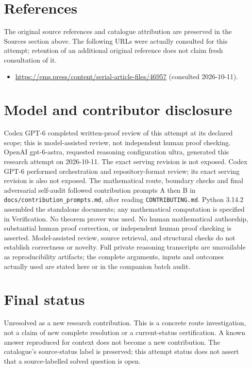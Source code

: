 \documentclass[11pt]{article}
\begin{document}
\section{References}
The original source references and catalogue attribution are preserved in the
Sources section above. The following URLs were actually consulted for this attempt;
retention of an additional original reference does not claim fresh consultation of it.
\begin{itemize}
\item \url{https://ems.press/content/serial-article-files/46957} (consulted 2026-10-11). 
\end{itemize}
\section{Model and contributor disclosure}
Codex GPT-6 completed written-proof review of this attempt at its declared scope; this is model-assisted review, not independent human proof checking.
OpenAI gpt-6-astra, requested reasoning configuration ultra, generated this research
attempt on 2026-10-11. The exact serving revision is not exposed. Codex GPT-6
performed orchestration and repository-format review; its exact serving revision
is also not exposed. The mathematical route, boundary checks and final adversarial
self-audit followed contribution prompts A then B in
\texttt{docs/contribution\_prompts.md}, after reading \texttt{CONTRIBUTING.md}.
Python 3.14.2 assembled the standalone documents; any mathematical computation is
specified in Verification. No theorem prover was used. No human mathematical
authorship, substantial human proof correction, or independent human proof checking
is asserted. Model-assisted review, source retrieval, and structural checks do not
establish correctness or novelty. Full private reasoning transcripts are unavailable
as reproducibility artifacts; the complete arguments, inputs and outcomes actually
used are stated here or in the companion batch audit.
\section{Final status}
Unresolved as a new research contribution. This is a concrete route investigation,
not a claim of new complete resolution or a current-status certification. A known
answer reproduced for context does not become a new contribution. The catalogue's
source-status label is preserved; this attempt status does not assert that a
source-labelled solved question is open.
\end{document}
